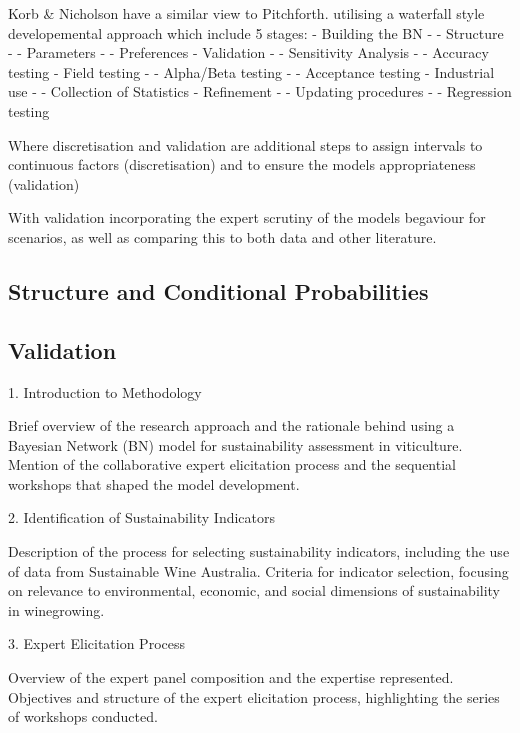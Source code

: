 Korb & Nicholson have a similar view to Pitchforth. utilising a waterfall style developemental approach which include 5 stages:
- Building the BN
-       - Structure
-       - Parameters
-       - Preferences
- Validation
-       - Sensitivity Analysis
-       - Accuracy testing
- Field testing
-       - Alpha/Beta testing
-       - Acceptance testing
- Industrial use
-       - Collection of Statistics
- Refinement
-       - Updating procedures
-       - Regression testing

Where discretisation and validation are additional steps to assign intervals to continuous factors (discretisation) and to ensure the models appropriateness (validation)

With validation incorporating the expert scrutiny of the models begaviour for scenarios, as well as comparing this to both data and other literature.


\subsection{Structure and Conditional Probabilities}

\subsection{Validation}

\citep{korbBayesianArtificialIntelligence2011}





1. Introduction to Methodology

    Brief overview of the research approach and the rationale behind using a Bayesian Network (BN) model for sustainability assessment in viticulture.
    Mention of the collaborative expert elicitation process and the sequential workshops that shaped the model development.

2. Identification of Sustainability Indicators

    Description of the process for selecting sustainability indicators, including the use of data from Sustainable Wine Australia.
    Criteria for indicator selection, focusing on relevance to environmental, economic, and social dimensions of sustainability in winegrowing.

3. Expert Elicitation Process

    Overview of the expert panel composition and the expertise represented.
    Objectives and structure of the expert elicitation process, highlighting the series of workshops conducted.

